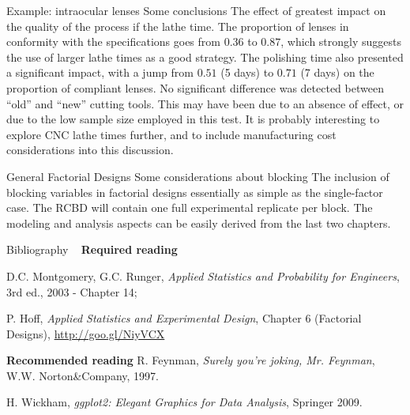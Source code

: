 \documentclass[t]{beamer}
\begin{document}

\begin{ftst}
{Example: intraocular lenses}
{Some conclusions}
The effect of greatest impact on the quality of the process if the lathe time. The proportion of lenses in conformity with the specifications goes from $0.36$ to $0.87$, which strongly suggests the use of larger lathe times as a good strategy.
\vone
The polishing time  also presented a significant impact, with a jump from $0.51$ (5 days) to $0.71$ (7 days) on the proportion of compliant lenses.
\vone
No significant difference was detected between ``old'' and ``new'' cutting tools. This may have been due to an absence of effect, or due to the low sample size employed in this test. 
\vone
It is probably interesting to explore CNC lathe times further, and to include manufacturing cost considerations into this discussion.
\end{ftst}


\begin{ftst}
{General Factorial Designs}
{Some considerations about blocking}
The inclusion of blocking variables in factorial designs essentially as simple as the single-factor case.
\vone
The RCBD will contain one full experimental replicate per block. The modeling and analysis aspects can be easily derived from the last two chapters.
\vone

\end{ftst}

\begin{ftst}
{Bibliography}
{\ }
\scriptsize
\textbf{Required reading}

\benums D.C. Montgomery, G.C. Runger, \textit{Applied Statistics and Probability for Engineers}, 3rd ed., 2003 - Chapter 14;
\item P. Hoff, \textit{Applied Statistics and Experimental Design}, Chapter 6 (Factorial Designs), \url{http://goo.gl/NiyVCX} 
\eenum

\textbf{Recommended reading}
\benums R. Feynman, \textit{Surely you're joking, Mr. Feynman}, W.W. Norton\&Company, 1997.
\item H. Wickham, \textit{ggplot2: Elegant Graphics for Data Analysis}, Springer 2009.
\eenum
\end{ftst}

\end{document}
